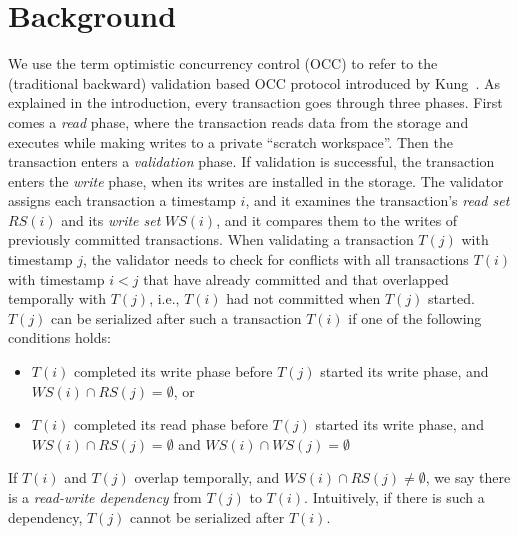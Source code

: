 \section{Background}\label{sec:background}

We use the term optimistic concurrency control (OCC) to refer to the (traditional backward) validation based OCC protocol introduced by Kung~\cite{kung81tods}.
As explained in the introduction, every transaction goes through three phases. First comes a \emph{read} phase, where the transaction reads data from the storage and executes while making writes to a private ``scratch workspace''. Then the transaction enters a \emph{validation} phase. If validation is successful, the transaction enters the \emph{write} phase, when its writes are installed in the storage. 
The validator assigns each transaction a timestamp $i$, and it examines the transaction's \emph{read set} $RS(i)$ and its \emph{write set} $WS(i)$, and it compares them to the writes of previously committed transactions. 
When validating a transaction $T(j)$ with timestamp $j$, the validator needs to check for conflicts with all transactions $T(i)$ with timestamp $i<j$ that have already committed and that overlapped temporally with $T(j)$, i.e., $T(i)$ had not committed when $T(j)$ started. 
$T(j)$ can be serialized after such a transaction $T(i)$ if one of the following conditions holds:
\begin{itemize}[leftmargin=*]
\item $T(i)$ completed its write phase before $T(j)$ started its write phase, and $WS(i) \cap RS(j) = \emptyset$, or
\item $T(i)$ completed its read phase before $T(j)$ started its write phase, and $WS(i) \cap RS(j) = \emptyset$ and $WS(i) \cap WS(j) = \emptyset$
\end{itemize}
If $T(i)$ and $T(j)$ overlap temporally, and $WS(i) \cap RS(j) \neq \emptyset$, we say there is a \emph{read-write dependency} from $T(j)$ to $T(i)$. Intuitively, if there is such a dependency, $T(j)$ cannot be serialized after $T(i)$. 

